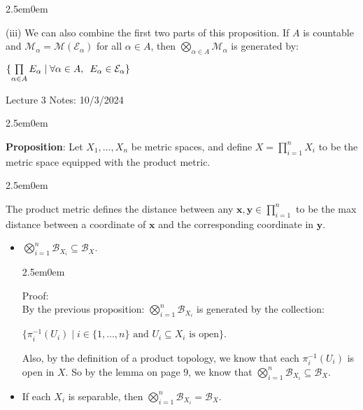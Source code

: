 \documentclass{book}
\newcommand{\hTwo}{%
\color{MidnightBlue}%
   \fontsize{13}{15}\selectfont%
}
\newcommand{\hThree}{%
   \color{PineGreen!85!Orange}
   \fontsize{12}{14}\selectfont%
}
\newcommand{\myComment}{%
   \color{RawerSienna}%
   \fontsize{12}{14}\selectfont%
}
\newenvironment{myIndent}{%
   \begin{adjustwidth}{2.5em}{0em}%
}{%
   \end{adjustwidth}%
}
\newcommand{\blab}[1]{\textbf{#1}}
\newcommand{\myHS}{ \hspace{0.5em}}
\newcommand{\retTwo}{\hfill\bigbreak}
\newcommand{\mHeader}[1]{{
   \color{Black}%
   \fontsize{20}{18}\selectfont%
   #1\retTwo
}}
\begin{document}
\begin{myIndent}
\begin{itemize}
      (iii) We can also combine the first two parts of this proposition. If $A$ is countable and $\mathcal{M}_\alpha = \mathcal{M}(\mathcal{E}_\alpha)$ for all $\alpha \in A$, then $\bigotimes\limits_{\alpha \in A}\mathcal{M}_\alpha$ is generated by:
      
      {\centering $\{\prod\limits_{\alpha \in A}E_\alpha \mid \forall \alpha \in A, \myHS E_\alpha \in \mathcal{E}_\alpha\}$\retTwo\par}
   \end{itemize}
\end{myIndent}

\mHeader{Lecture 3 Notes: 10/3/2024}

\begin{myIndent}\hTwo
   \blab{Proposition}: Let $X_1, \ldots, X_n$ be metric spaces, and define $X = \prod\limits_{i=1}^n X_i$ to be the\\ [-8pt] metric space equipped with the product metric.
   
   \begin{myIndent}\myComment
      The product metric defines the distance between any $\bm{x}, \bm{y} \in \prod\limits_{i = 1}^n$ to be the max\\ distance between a coordinate of $\bm{x}$ and the corresponding coordinate in $\bm{y}$.\retTwo
   \end{myIndent}

   \begin{itemize}
      \item $\bigotimes\limits_{i = 1}^n \mathcal{B}_{X_i} \subseteq \mathcal{B}_X$.\\ [-10pt]
      \begin{myIndent}\hThree
         Proof:\\
         By the previous proposition: $\bigotimes\limits_{i = 1}^n \mathcal{B}_{X_i}$ is generated by the collection:
         
         {\centering $\{\pi_{i}^{-1}(U_i) \mid i \in \{1, \ldots, n\} \text{ and } U_i \subseteq X_i \text{ is open}\}$.\retTwo\par}

         Also, by the definition of a product topology, we know that each $\pi_{i}^{-1}(U_i)$ is\\ open in $X$. So by the lemma on page 9, we know that $\bigotimes\limits_{i = 1}^n \mathcal{B}_{X_i} \subseteq \mathcal{B}_X$.\newpage 
      \end{myIndent}

      \item If each $X_i$ is separable, then $\bigotimes\limits_{i = 1}^n \mathcal{B}_{X_i} = \mathcal{B}_X$.\\ [-10pt]
      

\end{itemize}
\end{myIndent}
\end{document}
